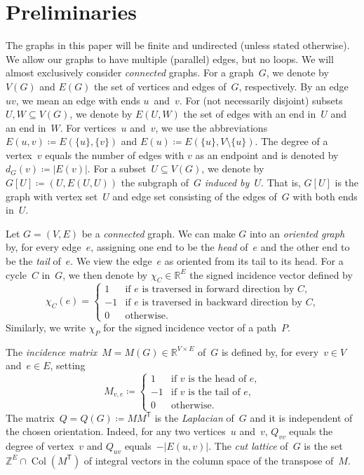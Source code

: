 \documentclass[ALCO,ThmDefs,Unicode,epreuves]{cedram}
\newcommand{\Z}{\ensuremath{\mathbb{Z}}}
\newcommand{\R}{\ensuremath{\mathbb{R}}}
\newcommand{\transp}{\mathsf{T}}
\DeclareMathOperator{\Col}{Col}
\begin{document}
\section{Preliminaries} 
The graphs in this paper will be finite and undirected (unless stated otherwise). We allow our graphs to have multiple (parallel) edges, but no loops. We will almost exclusively consider \emph{connected} graphs. For a graph~$G$, we denote by $V(G)$ and $E(G)$ the set of vertices and edges of~$G$, respectively. By an edge~$uv$, we mean an edge with ends $u$~and~$v$. For (not necessarily disjoint) subsets~$U,W\subseteq V(G)$, we denote by $E(U,W)$ the set of edges with an end in~$U$ and an end in~$W$. For vertices~$u$ and~$v$, we use the abbreviations $E(u,v)\coloneqq E(\{u\},\{v\})$ and $E(u)\coloneqq E(\{u\},V\setminus \{u\})$. The degree of a vertex~$v$ equals the number of edges with $v$ as an endpoint and is denoted by $d_G(v)\coloneqq |E(v)|$. For a subset~$U\subseteq V(G)$, we denote by $G[U]\coloneqq (U,E(U,U))$ the subgraph of~$G$ \emph{induced by~$U$}. That is, $G[U]$ is the graph with vertex set~$U$ and edge set consisting of the edges of~$G$ with both ends in~$U$.

Let $G=(V,E)$ be a \emph{connected} graph. We can make $G$ into an \emph{oriented graph} by, for every edge~$e$, assigning one end to be the \emph{head} of~$e$ and the other end to be the \emph{tail} of~$e$. We view the edge~$e$ as oriented from its tail to its head. For a cycle~$C$ in~$G$, we then denote by $\chi_C\in \R^{E}$ the signed incidence vector defined by
\begin{equation}
\chi_C(e)=\begin{cases}
1& \text{if $e$ is traversed in forward direction by $C$,}\\
-1&\text{if $e$ is traversed in backward direction by $C$,}\\
0&\text{otherwise.}
\end{cases}
\end{equation} 
Similarly, we write $\chi_P$ for the signed incidence vector of a path~$P$.

The \emph{incidence matrix}~$M=M(G)\in \R^{V\times E}$ of~$G$ is defined by, for every~$v\in V$ and~$e\in E$, setting 
\begin{equation}
M_{v,e}\coloneqq 
\begin{cases}
1&\text{if $v$ is the head of $e$,}\\
-1&\text{if $v$ is the tail of $e$,}\\
0&\text{otherwise.}
\end{cases}
\end{equation}
\noindent The matrix~$Q=Q(G)\coloneqq MM^\transp$ is the \emph{Laplacian} of~$G$ and it is independent of the chosen orientation. Indeed, for any two vertices~$u$ and~$v$, $Q_{vv}$ equals the degree of vertex~$v$ and $Q_{uv}$ equals~$-|E(u,v)|$. The \emph{cut lattice} of~$G$ is the set~$\Z^{E}\cap \Col(M^\transp)$ of integral vectors in the column space of the transpose of~$M$. 
\end{document}
